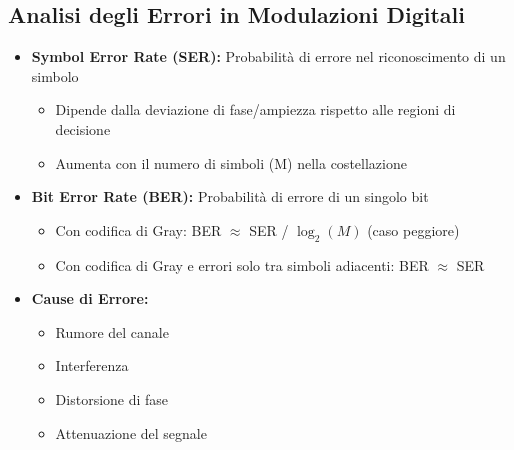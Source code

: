 \subsection{Analisi degli Errori in Modulazioni Digitali}
\begin{itemize}
    \item \textbf{Symbol Error Rate (SER):} Probabilità di errore nel riconoscimento di un simbolo
    \begin{itemize}
        \item Dipende dalla deviazione di fase/ampiezza rispetto alle regioni di decisione
        \item Aumenta con il numero di simboli (M) nella costellazione
    \end{itemize}
    \item \textbf{Bit Error Rate (BER):} Probabilità di errore di un singolo bit
    \begin{itemize}
        \item Con codifica di Gray: BER $\approx$ SER / $\log_2(M)$ (caso peggiore)
        \item Con codifica di Gray e errori solo tra simboli adiacenti: BER $\approx$ SER
    \end{itemize}
    \item \textbf{Cause di Errore:}
    \begin{itemize}
        \item Rumore del canale
        \item Interferenza
        \item Distorsione di fase
        \item Attenuazione del segnale
    \end{itemize}
\end{itemize}

